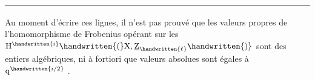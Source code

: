 \begin{minipage}{\linewidth}
\smallskip
\noindent\rule{0.32\linewidth}{0.4pt}\par
{\footnotesize\noindent\textsuperscript{}\quad Au moment d'écrire ces lignes, il n'est pas prouvé que les valeurs propres de l'homomorphisme de Frobenius opérant sur les $\mathrm{H}^{\handwritten{i}}\handwritten{(}\mathrm{X},\underline{\mathrm{Z}}_{\handwritten{\ell}}\handwritten{)}$ sont des entiers algébriques, ni à fortiori que \begingroup\let\sout\mbox{}\endgroup{} valeurs absolues sont égales à $\mathrm{q}^{\handwritten{i/2}}$ .\par}
\end{minipage}
